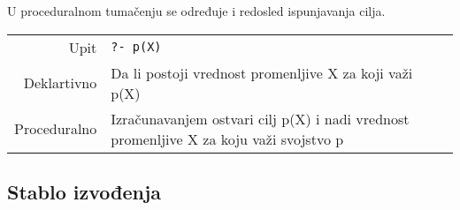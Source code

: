 \documentclass[../main.tex]{subfiles}
\begin{document}
U proceduralnom tumačenju se određuje i redosled ispunjavanja cilja.

\begin{boxprimer}
\begin{tabular}{rl}
Upit & \texttt{?- p(X)}\\
Deklartivno& Da li postoji vrednost promenljive X za koji važi p(X)\\
Proceduralno& Izračunavanjem ostvari cilj p(X) i nadi vrednost promenljive X za koju važi svojstvo p\\
\end{tabular}
\end{boxprimer}


\subsection{Stablo izvođenja}
\end{document}
